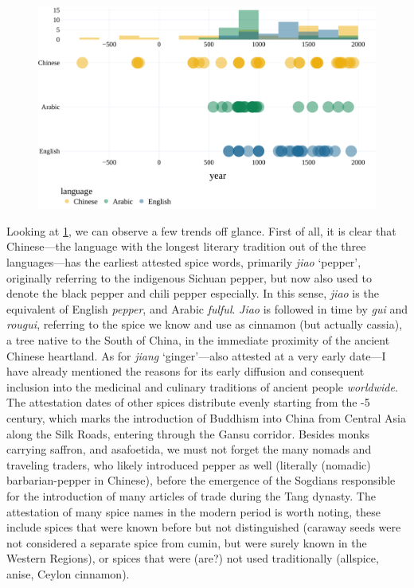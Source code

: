 \begin{figure}[!ht]
  \centering
  \includegraphics[width=\linewidth]{imgs/plots/attestation_compact.pdf}
  \caption{}
  \label{fig:attestation_compact}
\end{figure}

Looking at \cref{fig:attestation_compact}, we can observe a few trends off glance. First of all, it is clear that Chinese---the language with the longest literary tradition out of the three languages---has the earliest attested spice words, primarily \textit{jiao} `pepper', originally referring to the indigenous Sichuan pepper, but now also used to denote the black pepper and chili pepper especially. In this sense, \textit{jiao} is the equivalent of English \textit{pepper}, and Arabic \textit{fulful}. \textit{Jiao} is followed in time by \textit{gui} and \textit{rougui}, referring to the spice we know and use as cinnamon (but actually cassia), a tree native to the South of China, in the immediate proximity of the ancient Chinese heartland. As for \textit{jiang} `ginger'---also attested at a very early date---I have already mentioned the reasons for its early diffusion and consequent inclusion into the medicinal and culinary traditions of ancient people \textit{worldwide}. The attestation dates of other spices distribute evenly starting from the -{5} century, which marks the introduction of Buddhism into China from Central Asia along the Silk Roads, entering through the Gansu corridor. Besides monks carrying saffron, and asafoetida, we must not forget the many nomads and traveling traders, who likely introduced pepper as well (literally (nomadic) barbarian-pepper in Chinese), before the emergence of the Sogdians responsible for the introduction of many articles of trade during the Tang dynasty. 
The attestation of many spice names in the modern period is worth noting, these include spices that were known before but not distinguished (caraway seeds were not considered a separate spice from cumin, but were surely known in the Western Regions), or spices that were (are?) not used traditionally (allspice, anise, Ceylon cinnamon).

